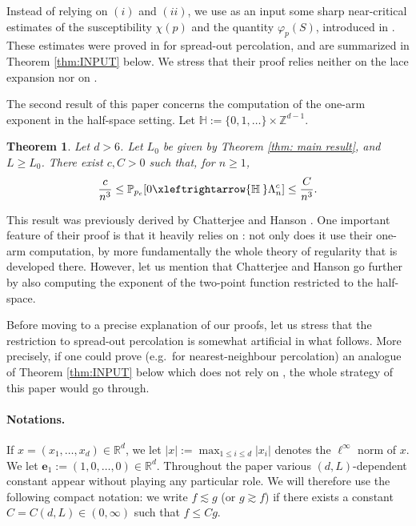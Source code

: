 \documentclass[11pt,a4paper]{article}
\numberwithin{equation}{section}
\theoremstyle{plain}
\newtheorem{Thm}{Theorem}[section]
\theoremstyle{definition}
\newcommand{\connect}{\xleftrightarrow}
\newcommand{\1}{\mathbf 1}
\def\P{\mathbb{P}} %
\def\bf{\bfseries}
\begin{document}
	Instead of relying on $(i)$ and $(ii)$, we use as an input some sharp near-critical estimates of the susceptibility $\chi(p)$ and the quantity $\varphi_p(S)$, introduced in \cite{DuminilTassionNewProofSharpness2016}. These estimates were proved in \cite{DumPan24Perco} for spread-out percolation, and are summarized in Theorem \ref{thm:INPUT} below.
	We stress that their proof relies  neither on the lace expansion nor on \cite{BarskyAizenmanCriticalExponentPercoUnderTriangle1991}.


The second result of this paper concerns the computation of the one-arm exponent in the half-space setting. Let $\mathbb H:=\{0,1,\ldots\}\times\mathbb Z^{d-1}$.

\begin{Thm}\label{thm: halfspace one arm} Let $d>6$. Let $L_0$ be given by Theorem \textup{\ref{thm: main result}}, and $L\geq L_0$. There exist $c,C>0$ such that, for $n\geq 1$,
	\begin{equation}\label{eq:main_half-space}
		\frac{c}{n^3} 
		\leq  \P_{p_c}[0\connect{\mathbb H\:}\Lambda_{n}^c]   \leq \frac{C}{n^3}.
	\end{equation}
\end{Thm}
This result was previously derived by Chatterjee and Hanson \cite{ChatterjeeHanson}. One important feature of their proof is that it heavily relies on  \cite{KozmaNachmias}: not only does it use their one-arm computation, by more fundamentally the whole theory of regularity that is developed there. However, let us mention that Chatterjee and Hanson go further by also computing the exponent of the two-point function restricted to the half-space.

Before moving to a precise explanation of our proofs, let us stress that the restriction to spread-out percolation is somewhat artificial in what follows. More precisely, if one could prove (e.g.\ for nearest-neighbour percolation) an analogue of Theorem \ref{thm:INPUT} below which does not rely on \cite{KozmaNachmias}, the whole strategy of this paper would go through.

\paragraph{Notations.} If $x=(x_1,\ldots,x_d)\in \mathbb R^d$, we let $|x|:=\max_{1\leq i\leq d}|x_i|$ denotes the $\ell^\infty$ norm of $x$. We let $\mathbf{e}_1:=(1,0,\ldots,0)\in \mathbb R^d$. Throughout the paper various $(d,L)$-dependent constant appear without playing any particular role. We will therefore use the following compact notation: we write $f\lesssim g$ (or $g\gtrsim  f$) if there exists a constant $C=C(d,L)\in (0,\infty)$ such that $f\leq Cg$.
\end{document}
